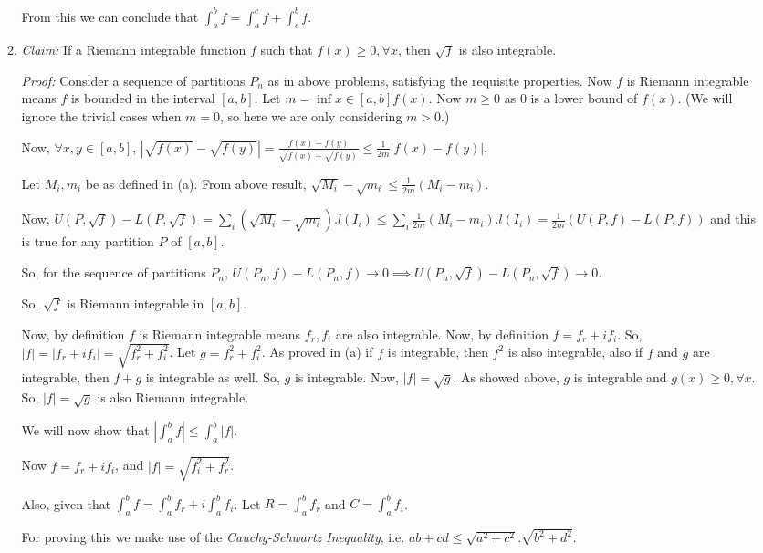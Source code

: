 \documentclass[11pt]{amsart}
\theoremstyle{definition}
\begin{document}
\begin{enumerate}[wide, labelwidth=!, labelindent=0pt]
\begin{enumerate}[label=(\alph*)]
From this we can conclude that $\int_a^b f = \int_a^c f + \int_c^b f$.

\item 

\textit{Claim:} If a Riemann integrable function $f$ such that $f(x) \ge 0, \forall x$, then $\sqrt{f}$ is also integrable.

\textit{Proof:} Consider a sequence of partitions $P_n$ as in above problems, satisfying the requisite properties. Now $f$ is Riemann integrable means $f$ is bounded in the interval $[a,b]$. Let $m = \inf{x \in [a,b]} f(x)$. Now $m \ge 0$ as $0$ is a lower bound of $f(x)$. (We will ignore the trivial cases when $m = 0$, so here we are only considering $m > 0$.)

Now, $\forall x,y \in [a,b]$, $|\sqrt{f(x)} - \sqrt{f(y)}| = \frac{|f(x) - f(y)|}{\sqrt{f(x)} + \sqrt{f(y)}} \le \frac{1}{2m}|f(x) - f(y)|$.

Let $M_i, m_i$ be as defined in (a). From above result, $\sqrt{M_i} - \sqrt{m_i} \le \frac{1}{2m} (M_i - m_i)$.

Now, $U(P,\sqrt{f}) - L(P,\sqrt{f}) = \sum_i (\sqrt{M_i}-\sqrt{m_i}).l(I_i) \le \sum_i \frac{1}{2m} (M_i - m_i).l(I_i) = \frac{1}{2m} (U(P,f) - L(P,f))$ and this is true for any partition $P$ of $[a,b]$.

So, for the sequence of partitions $P_n$, $U(P_{n},f)-L(P_{n},f) \to 0 \implies U(P_{n},\sqrt{f})-L(P_{n},\sqrt{f}) \to 0$.

So, $\sqrt{f}$ is Riemann integrable in $[a,b]$.

Now, by definition $f$ is Riemann integrable means $f_r, f_i$ are also integrable. Now, by definition $f = f_r + i f_i$. So, $|f| = |f_r + i f_i| = \sqrt{f_r^2 + f_i^2}$. Let $g = f_r^2 + f_i^2$. As proved in (a) if $f$ is integrable, then $f^2$ is also integrable, also if $f$ and $g$ are integrable, then $f+g$ is integrable as well. So, $g$ is integrable. Now, $|f| = \sqrt{g}$. As showed above, $g$ is integrable and $g(x)\ge 0, \forall x$. So, $|f| = \sqrt{g}$ is also Riemann integrable.

We will now show that $|\int_a^b f| \le \int_a^b |f|$.

Now $f = f_r + i f_i$, and $|f| = \sqrt{f_i^2 + f_r^2}$.

Also, given that $\int_a^b f = \int_a^b f_r+ i \int_a^b f_i$. Let $R = \int_a^b f_r$ and $C = \int_a^b f_i$.

For proving this we make use of the \textit{Cauchy-Schwartz Inequality}, i.e. $ab + cd \le \sqrt{a^2 + c^2}.\sqrt{b^2 + d^2}$.


\end{enumerate}
\end{enumerate}
\end{document}
